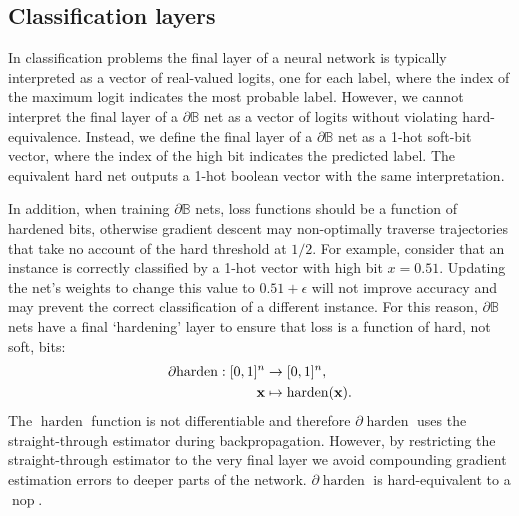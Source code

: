 \documentclass{article} %
\begin{document}
\subsection{Classification layers}

In classification problems the final layer of a neural network is typically interpreted as a vector of real-valued logits, one for each label, where the index of the maximum logit indicates the most probable label. However, we cannot interpret the final layer of a $\partial\mathbb{B}$ net as a vector of logits without violating hard-equivalence. Instead, we define the final layer of a $\partial\mathbb{B}$ net as a 1-hot soft-bit vector, where the index of the high bit indicates the predicted label. The equivalent hard net outputs a 1-hot boolean vector with the same interpretation.

In addition, when training $\partial\mathbb{B}$ nets, loss functions should be a function of hardened bits, otherwise gradient descent may non-optimally traverse trajectories that take no account of the hard threshold at $1/2$. For example, consider that an instance is correctly classified by a 1-hot vector with high bit $x=0.51$. Updating the net's weights to change this value to $0.51+\epsilon$ will not improve accuracy and may prevent the correct classification of a different instance. For this reason, $\partial\mathbb{B}$ nets have a final `hardening' layer to ensure that loss is a function of hard, not soft, bits:
\begin{equation*}
\begin{aligned}
\partial\!\operatorname{harden}: [0,1]^{n} &\to [0,1]^{n}, \\
{\bf x} &\mapsto \operatorname{harden}({\bf x})\text{.}
\end{aligned}
\end{equation*}
The $\operatorname{harden}$ function is not differentiable and therefore $\partial\!\operatorname{harden}$ uses the straight-through estimator \citep{DBLP:journals/corr/BengioLC13} during backpropagation. However, by restricting the straight-through estimator to the very final layer we avoid compounding gradient estimation errors to deeper parts of the network. $\partial\!\operatorname{harden}$ is hard-equivalent to a $\operatorname{nop}$.
\end{document}
